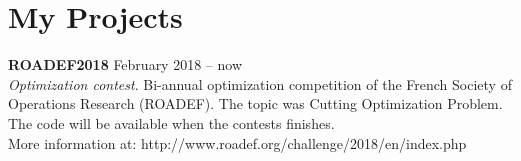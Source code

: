 			\section{My Projects} 
        
        
	    	

\textbf{ROADEF2018} 
	\hfill February 2018 -- now\\
		\textsl{Optimization contest}. Bi-annual optimization competition of the French Society of Operations Research (ROADEF). The topic was Cutting Optimization Problem. The code will be available when the contests finishes.\\
		More information at: http://www.roadef.org/challenge/2018/en/index.php

